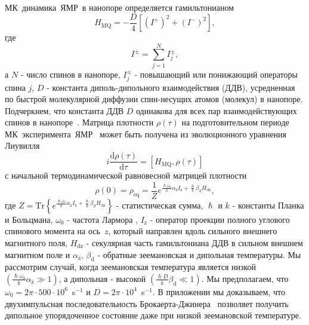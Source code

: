 \documentclass[utf8]{jetp}
\begin{document}
МК~динамика~ЯМР~в нанопоре определяется гамильтонианом~\cite{Doronin_2019,Doronin_2009}
%
\begin{equation}
  \label{eq:1}
  H_{\mathrm{MQ}} = - \dfrac{D}{4} \left[
    \left(I^{+}\right)^{2}
    + \left(I^{-}\right)^{2}
  \right] ,
\end{equation}
%
где
%
\begin{equation}
  \label{eq:2}
  I^{\pm} = \sum\limits_{j=1}^{N} I_{j}^{\pm},
\end{equation}
%
а $N$ - число спинов в нанопоре, $I^{\pm}_{j}$ - повышающий или понижающий операторы спина $j$, $D$ - константа диполь-дипольного взаимодействия (ДДВ),
усредненная по быстрой молекулярной диффузии спин-несущих атомов (молекул) в нанопоре.
Подчеркнем, что константа ДДВ $D$ одинакова для всех пар взаимодействующих спинов в нанопоре~\cite{Doronin_2019,Doronin_2009}.
Матрица плотности $\rho(\tau)$ на подготовительном периоде МК~эксперимента~ЯМР~\cite{Baum_1985} может быть получена из эволюционного уравнения Лиувилля~\cite{Goldman_1970,Abragam_1982}
%
\begin{equation}
  \label{eq:3}
  i\dfrac{\mathrm{d}\rho(\tau)}{\mathrm{d}\tau} = \left[
  H_\mathrm{MQ},\rho(\tau)
  \right]
\end{equation}
%
с начальной термодинамической равновесной матрицей плотности
%
\begin{equation}
  \label{eq:4}
    \rho(0) = \rho_\mathrm{eq} = \dfrac{1}{Z}
    e^{
      \frac{\hslash \omega_{0}}{k} \alpha_\mathrm{z} I_\mathrm{z}
      + \frac{\hslash }{k} \beta_\mathrm{d} H_\mathrm{dz}
    },
\end{equation}
%
где
$Z = \mathrm{Tr} \left\{ e^{\frac{\hslash \omega_{0}}{k} \alpha_\mathrm{z} I_\mathrm{z} + \frac{\hslash }{k} \beta_\mathrm{d} H_\mathrm{dz}} \right\}$ - статистическая сумма,
$\hslash$ и $k$ - константы Планка и Больцмана,
$\omega_{0}$ - частота Лармора ,
$I_\mathrm{z}$ -  оператор проекции полного углового спинового момента  на ось~$z$,
который направлен вдоль сильного внешнего магнитного поля,
$H_\mathrm{dz}$ - секулярная часть гамильтониана ДДВ в сильном внешнем магнитном поле
и $\alpha_\mathrm{z}$, $\beta_\mathrm{d}$ - обратные зеемановская и дипольная температуры.
Мы рассмотрим случай, когда зеемановская температура  является низкой $({\frac{\hslash \omega_{0}}{k} \alpha_\mathrm{z}}\gg 1)$,
а дипольная - высокой $\left( \frac{\hslash{D}}{k}\beta_\mathrm{d} \ll 1\right)$.
Мы предполагаем, что $\omega_{0} = 2\pi \cdot 500 \cdot 10^{6}$~s$^{-1}$ и $D = 2\pi \cdot 10^{4}$~s$^{-1}$.
В приложении мы доказываем, что двухимпульсная последовательность Брокаерта-Джинера~\cite{Goldman_1970,Jeener_1967} позволяет получить дипольное упорядоченное состояние даже при низкой зеемановской температуре.
\end{document}

